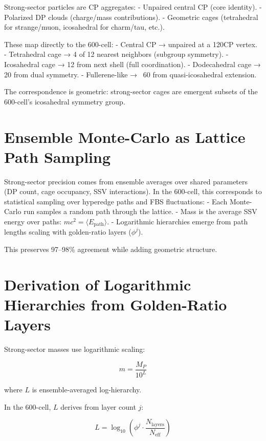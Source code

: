 \documentclass[11pt]{article}
\begin{document}
Strong-sector particles are CP aggregates:
- Unpaired central CP (core identity).
- Polarized DP clouds (charge/mass contributions).
- Geometric cages (tetrahedral for strange/muon, icosahedral for charm/tau, etc.).

These map directly to the 600-cell:
- Central CP → unpaired at a 120CP vertex.
- Tetrahedral cage → 4 of 12 nearest neighbors (subgroup symmetry).
- Icosahedral cage → 12 from next shell (full coordination).
- Dodecahedral cage → 20 from dual symmetry.
- Fullerene-like → ~60 from quasi-icosahedral extension.

The correspondence is geometric: strong-sector cages are emergent subsets of the 600-cell’s icosahedral symmetry group.

\section{Ensemble Monte-Carlo as Lattice Path Sampling}

Strong-sector precision comes from ensemble averages over shared parameters (DP count, cage occupancy, SSV interactions). In the 600-cell, this corresponds to statistical sampling over hyperedge paths and FBS fluctuations:
- Each Monte-Carlo run samples a random path through the lattice.
- Mass is the average SSV energy over paths: $m c^2 = \langle E_{\text{path}} \rangle$.
- Logarithmic hierarchies emerge from path lengths scaling with golden-ratio layers ($\phi^j$).

This preserves 97–98\% agreement while adding geometric structure.

\section{Derivation of Logarithmic Hierarchies from Golden-Ratio Layers}

Strong-sector masses use logarithmic scaling:

\begin{equation}
m = \frac{M_P}{10^{L}}
\end{equation}

where $L$ is ensemble-averaged log-hierarchy.

In the 600-cell, $L$ derives from layer count $j$:

\begin{equation}
L = \log_{10} \left( \phi^j \cdot \frac{N_{\text{layers}}}{N_{\text{eff}}} \right)
\end{equation}
\end{document}
